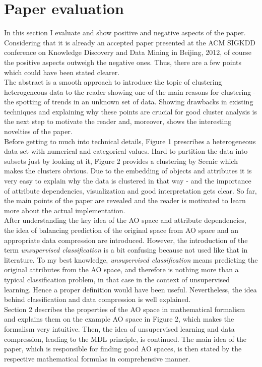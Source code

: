 \documentclass[conference]{IEEEtran}
\begin{document}
\section{Paper evaluation}
In this section I evaluate \cite{scenic} and show positive and negative aspects of the paper. Considering that it is already an accepted paper presented at the ACM SIGKDD conference on Knowledge Discovery and Data Mining in Beijing, 2012, of course the positive aspects outweigh the negative ones. Thus, there are a few points which could have been stated clearer. 
\\
The abstract is a smooth approach to introduce the topic of clustering heterogeneous data to the reader showing one of the main reasons for clustering - the spotting of trends in an unknown set of data. Showing drawbacks in existing techniques and explaining why these points are crucial for good cluster analysis is the next step to motivate the reader and, moreover, shows the interesting novelties of the paper. 
\\
Before getting to much into technical details, Figure 1\cite{scenic} prescribes a heterogeneous data set with numerical and categorical values. Hard to partition the data into subsets just by looking at it, Figure 2\cite{scenic} provides a clustering by Scenic which makes the clusters obvious. Due to the embedding of objects and attributes it is very easy to explain why the data is clustered in that way - and the importance of attribute dependencies, visualization and good interpretation gets clear. So far, the main points of the paper are revealed and the reader is motivated to learn more about the actual implementation.
\\
After understanding the key idea of the AO space and attribute dependencies, the idea of balancing prediction of the original space from AO space and an appropriate data compression are introduced. However, the introduction of the term \textit{unsupervised classification} is a bit confusing because not used like that in literature. To my best knowledge, \textit{unsupervised classification} means predicting the original attributes from the AO space, and therefore is nothing more than a typical classification problem, in that case in the context of unsupervised learning. Hence a proper definition would have been useful. Nevertheless, the idea behind classification and data compression is well explained.
\\
Section 2 describes the properties of the AO space in mathematical formalism and explains them on the example AO space in Figure 2\cite{scenic}, which makes the formalism very intuitive. Then, the idea of unsupervised learning and data compression, leading to the MDL principle, is continued. The main idea of the paper, which is responsible for finding good AO spaces, is then stated by the respective mathematical formulas in comprehensive manner.
\end{document}
